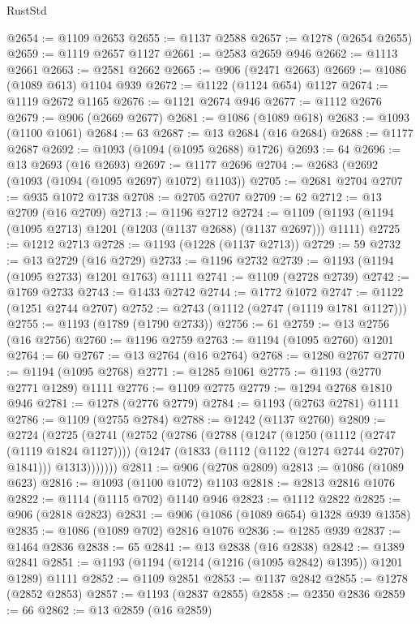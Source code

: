 \begin{lexlean}{RustStd}
\begin{coremodule}
{\begin{coremodule}
{{{{{{{{{{{{{{{{{{{{{{{{{{{{{{{@2654 := @1109 @2653
@2655 := @1137 @2588
@2657 := @1278 (@2654 @2655)
@2659 := @1119 @2657 @1127
@2661 := @2583 @2659 @946
@2662 := @1113 @2661
@2663 := @2581 @2662
@2665 := @906 (@2471 @2663)
@2669 := @1086 (@1089 @613) @1104 @939
@2672 := @1122 (@1124 @654) @1127
@2674 := @1119 @2672 @1165
@2676 := @1121 @2674 @946
@2677 := @1112 @2676
@2679 := @906 (@2669 @2677)
@2681 := @1086 (@1089 @618)
@2683 := @1093 (@1100 @1061)
@2684 := 63
@2687 := @13 @2684 (@16 @2684)
@2688 := @1177 @2687
@2692 := @1093 (@1094 (@1095 @2688) @1726)
@2693 := 64
@2696 := @13 @2693 (@16 @2693)
@2697 := @1177 @2696
@2704 := @2683 (@2692 (@1093 (@1094 (@1095 @2697) @1072) @1103))
@2705 := @2681 @2704
@2707 := @935 @1072 @1738
@2708 := @2705 @2707
@2709 := 62
@2712 := @13 @2709 (@16 @2709)
@2713 := @1196 @2712
@2724 := @1109 (@1193 (@1194 (@1095 @2713) @1201 (@1203 (@1137 @2688) (@1137 @2697))) @1111)
@2725 := @1212 @2713
@2728 := @1193 (@1228 (@1137 @2713))
@2729 := 59
@2732 := @13 @2729 (@16 @2729)
@2733 := @1196 @2732
@2739 := @1193 (@1194 (@1095 @2733) @1201 @1763) @1111
@2741 := @1109 (@2728 @2739)
@2742 := @1769 @2733
@2743 := @1433 @2742
@2744 := @1772 @1072
@2747 := @1122 (@1251 @2744 @2707)
@2752 := @2743 (@1112 (@2747 (@1119 @1781 @1127)))
@2755 := @1193 (@1789 (@1790 @2733))
@2756 := 61
@2759 := @13 @2756 (@16 @2756)
@2760 := @1196 @2759
@2763 := @1194 (@1095 @2760) @1201
@2764 := 60
@2767 := @13 @2764 (@16 @2764)
@2768 := @1280 @2767
@2770 := @1194 (@1095 @2768)
@2771 := @1285 @1061
@2775 := @1193 (@2770 @2771 @1289) @1111
@2776 := @1109 @2775
@2779 := @1294 @2768 @1810 @946
@2781 := @1278 (@2776 @2779)
@2784 := @1193 (@2763 @2781) @1111
@2786 := @1109 (@2755 @2784)
@2788 := @1242 (@1137 @2760)
@2809 := @2724
    (@2725
      (@2741
        (@2752
          (@2786
            (@2788
              (@1247
                (@1250 (@1112 (@2747 (@1119 @1824 @1127))))
                (@1247 (@1833 (@1112 (@1122 (@1274 @2744 @2707) @1841))) @1313)))))))
@2811 := @906 (@2708 @2809)
@2813 := @1086 (@1089 @623)
@2816 := @1093 (@1100 @1072) @1103
@2818 := @2813 @2816 @1076
@2822 := @1114 (@1115 @702) @1140 @946
@2823 := @1112 @2822
@2825 := @906 (@2818 @2823)
@2831 := @906 (@1086 (@1089 @654) @1328 @939 @1358)
@2835 := @1086 (@1089 @702) @2816 @1076
@2836 := @1285 @939
@2837 := @1464 @2836
@2838 := 65
@2841 := @13 @2838 (@16 @2838)
@2842 := @1389 @2841
@2851 := @1193 (@1194 (@1214 (@1216 (@1095 @2842) @1395)) @1201 @1289) @1111
@2852 := @1109 @2851
@2853 := @1137 @2842
@2855 := @1278 (@2852 @2853)
@2857 := @1193 (@2837 @2855)
@2858 := @2350 @2836
@2859 := 66
@2862 := @13 @2859 (@16 @2859)
}}}}}}}}}}}}}}}}}}}}}}}}}}}}}}}
\end{coremodule}}
\end{coremodule}
\end{lexlean}
